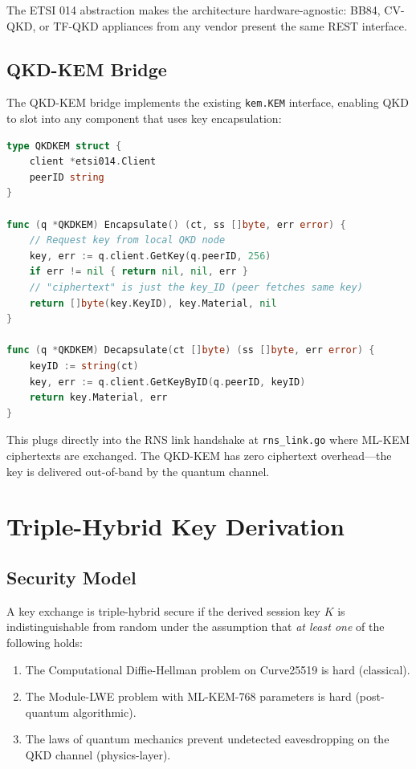\documentclass[11pt,letterpaper]{article}
\begin{document}
The ETSI 014 abstraction makes the architecture hardware-agnostic: BB84, CV-QKD, or TF-QKD appliances from any vendor present the same REST interface.

\subsection{QKD-KEM Bridge}

The QKD-KEM bridge implements the existing \texttt{kem.KEM} interface, enabling QKD to slot into any component that uses key encapsulation:

\begin{lstlisting}[language=Go,caption={QKD-KEM bridge implementing existing KEM interface.}]
type QKDKEM struct {
    client *etsi014.Client
    peerID string
}

func (q *QKDKEM) Encapsulate() (ct, ss []byte, err error) {
    // Request key from local QKD node
    key, err := q.client.GetKey(q.peerID, 256)
    if err != nil { return nil, nil, err }
    // "ciphertext" is just the key_ID (peer fetches same key)
    return []byte(key.KeyID), key.Material, nil
}

func (q *QKDKEM) Decapsulate(ct []byte) (ss []byte, err error) {
    keyID := string(ct)
    key, err := q.client.GetKeyByID(q.peerID, keyID)
    return key.Material, err
}
\end{lstlisting}

This plugs directly into the RNS link handshake at \texttt{rns\_link.go} where ML-KEM ciphertexts are exchanged. The QKD-KEM has zero ciphertext overhead---the key is delivered out-of-band by the quantum channel.

\section{Triple-Hybrid Key Derivation}

\subsection{Security Model}

\begin{definition}
A key exchange is triple-hybrid secure if the derived session key $K$ is indistinguishable from random under the assumption that \emph{at least one} of the following holds:
\begin{enumerate}
\item The Computational Diffie-Hellman problem on Curve25519 is hard (classical).
\item The Module-LWE problem with ML-KEM-768 parameters is hard (post-quantum algorithmic).
\item The laws of quantum mechanics prevent undetected eavesdropping on the QKD channel (physics-layer).
\end{enumerate}
\end{definition}
\end{document}
